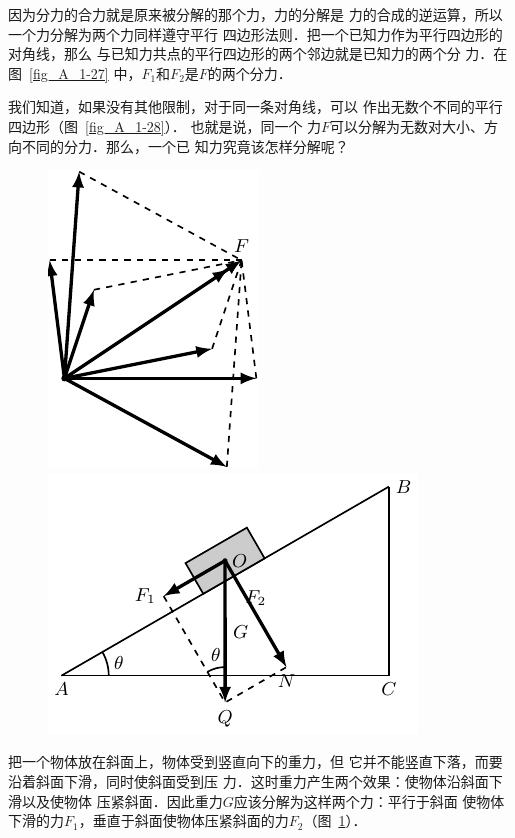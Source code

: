     因为分力的合力就是原来被分解的那个力，力的分解是
力的合成的逆运算，所以一个力分解为两个力同样遵守平行
四边形法则．把一个已知力作为平行四边形的对角线，那么
与已知力共点的平行四边形的两个邻边就是已知力的两个分
力．在图~\ref{fig_A_1-27} 中，$F_1$和$F_2$是$F$的两个分力．


    我们知道，如果没有其他限制，对于同一条对角线，可以
作出无数个不同的平行四边形（图~\ref{fig_A_1-28}）．
也就是说，同一个
力$F$可以分解为无数对大小、方向不同的分力．那么，一个已
知力究竟该怎样分解呢？

\begin{figure}[htbp]
	\centering
	\begin{minipage}[b]{0.46\textwidth} 
		\centering
		\includegraphics{fig/A/1-28.pdf} 
		\caption{} \label{fig_A_1-28} 
	\end{minipage} 
	\begin{minipage}[b]{0.5\textwidth} 
		\centering
		\includegraphics{fig/A/1-29.pdf} 
		\caption{} \label{fig_A_1-29} 
	\end{minipage} 
\end{figure} 


    把一个物体放在斜面上，物体受到竖直向下的重力，但
它并不能竖直下落，而要沿着斜面下滑，同时使斜面受到压
力．这时重力产生两个效果：使物体沿斜面下滑以及使物体
压紧斜面．因此重力$G$应该分解为这样两个力：平行于斜面
使物体下滑的力$F_1$，垂直于斜面使物体压紧斜面的力$F_2$（图~\ref{fig_A_1-29}）．



